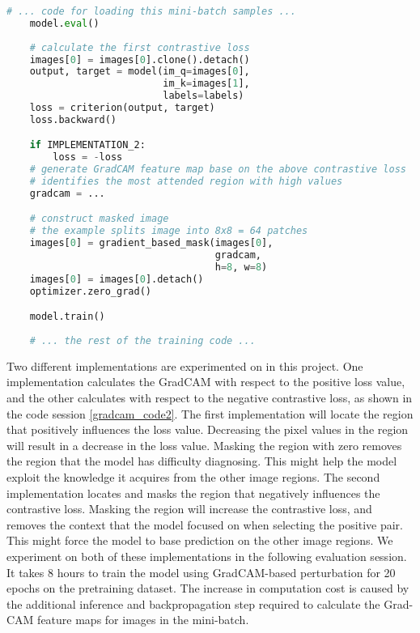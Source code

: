 \documentclass[12pt,twoside]{report}
\begin{document}
\begin{lstlisting}[language=Python, caption=additional training code for using ]
    # ... code for loading this mini-batch samples ...
    model.eval()
    
    # calculate the first contrastive loss
    images[0] = images[0].clone().detach()
    output, target = model(im_q=images[0], 
                           im_k=images[1], 
                           labels=labels)
    loss = criterion(output, target)
    loss.backward()

    if IMPLEMENTATION_2:
        loss = -loss
    # generate GradCAM feature map base on the above contrastive loss
    # identifies the most attended region with high values
    gradcam = ...

    # construct masked image
    # the example splits image into 8x8 = 64 patches
    images[0] = gradient_based_mask(images[0], 
                                    gradcam, 
                                    h=8, w=8)
    images[0] = images[0].detach()
    optimizer.zero_grad()

    model.train()
    
    # ... the rest of the training code ...
\end{lstlisting} \label{gradcam_code2}

Two different implementations are experimented on in this project. One implementation calculates the GradCAM with respect to the positive loss value, and the other calculates with respect to the negative contrastive loss, as shown in the code session \ref{gradcam_code2}. The first implementation will locate the region that positively influences the loss value. Decreasing the pixel values in the region will result in a decrease in the loss value. Masking the region with zero removes the region that the model has difficulty diagnosing. This might help the model exploit the knowledge it acquires from the other image regions. The second implementation locates and masks the region that negatively influences the contrastive loss. Masking the region will increase the contrastive loss, and removes the context that the model focused on when selecting the positive pair. This might force the model to base prediction on the other image regions. We experiment on both of these implementations in the following evaluation session. \\

It takes 8 hours to train the model using GradCAM-based perturbation for 20 epochs on the pretraining dataset. The increase in computation cost is caused by the additional inference and backpropagation step required to calculate the Grad-CAM feature maps for images in the mini-batch. 
\end{document}
